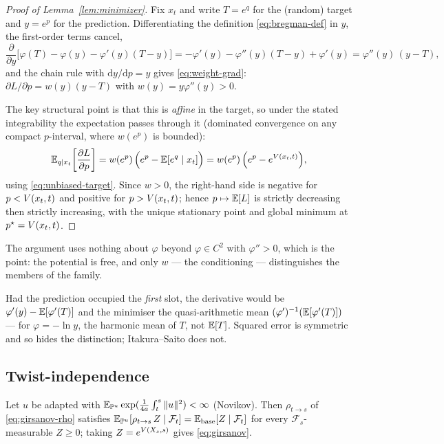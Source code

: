 \begin{proof}[Proof of Lemma~\ref{lem:minimizer}]
Fix $x_t$ and write $T=e^{q}$ for the (random) target and $y=e^{p}$ for the
prediction. Differentiating the definition \eqref{eq:bregman-def} in $y$, the
first-order terms cancel,
\begin{equation}
  \frac{\partial}{\partial y}\Big[\varphi(T)-\varphi(y)-\varphi'(y)(T-y)\Big]
  = -\varphi'(y)-\varphi''(y)(T-y)+\varphi'(y)
  = \varphi''(y)\,(y-T),
\end{equation}
and the chain rule with $\mathrm{d}y/\mathrm{d}p=y$ gives
\eqref{eq:weight-grad}:
$\partial L/\partial p = w(y)(y-T)$ with $w(y)=y\varphi''(y)>0$.

The key structural point is that this is \emph{affine} in the target, so under
the stated integrability the expectation passes through it (dominated
convergence on any compact $p$-interval, where $w(e^{p})$ is bounded):
\begin{equation}
  \mathbb{E}_{q\mid x_t}\!\left[\frac{\partial L}{\partial p}\right]
  = w(e^{p})\,\Big(e^{p}-\mathbb{E}[e^{q}\mid x_t]\Big)
  = w(e^{p})\,\Big(e^{p}-e^{V(x_t,t)}\Big),
\end{equation}
using \eqref{eq:unbiased-target}. Since $w>0$, the right-hand side is
negative for $p<V(x_t,t)$ and positive for $p>V(x_t,t)$; hence
$p\mapsto\mathbb{E}[L]$ is strictly decreasing then strictly increasing, with the
unique stationary point and global minimum at $p^{\star}=V(x_t,t)$.
\end{proof}

\noindent The argument uses nothing about $\varphi$ beyond $\varphi\in C^{2}$ with
$\varphi''>0$, which is the point: the potential is free, and only $w$ --- the conditioning
--- distinguishes the members of the family.

\begin{remark}
Had the prediction occupied the \emph{first} slot, the derivative would be
$\varphi'(y)-\mathbb{E}[\varphi'(T)]$ and the minimiser the quasi-arithmetic mean
$(\varphi')^{-1}(\mathbb{E}[\varphi'(T)])$ --- for $\varphi=-\ln y$, the harmonic mean
of $T$, not $\mathbb{E}[T]$. Squared error is symmetric and so hides the distinction;
Itakura--Saito does not.
\end{remark}

\subsection{Twist-independence}

\begin{proposition}
Let $u$ be adapted with $\mathbb{E}_{\mathbb{P}^{u}}\exp(\tfrac{1}{4a}\int_t^s\|u\|^2)<\infty$
(Novikov). Then $\rho_{t\to s}$ of \eqref{eq:girsanov-rho} satisfies
$\mathbb{E}_{\mathbb{P}^{u}}[\rho_{t\to s}\,Z\mid\mathcal{F}_t]=\mathbb{E}_{\mathrm{base}}[Z\mid\mathcal{F}_t]$
for every $\mathcal{F}_s$-measurable $Z\ge0$; taking $Z=e^{V(X_s,s)}$ gives
\eqref{eq:girsanov}.
\end{proposition}


